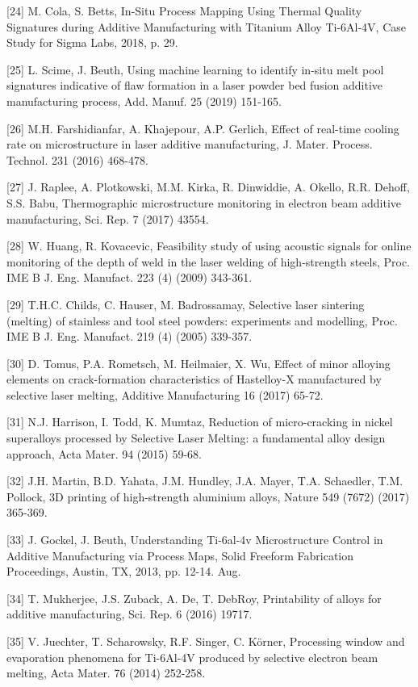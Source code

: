 \documentclass[10pt]{article}
\begin{document}
[24] M. Cola, S. Betts, In-Situ Process Mapping Using Thermal Quality Signatures during Additive Manufacturing with Titanium Alloy Ti-6Al-4V, Case Study for Sigma Labs, 2018, p. 29.

[25] L. Scime, J. Beuth, Using machine learning to identify in-situ melt pool signatures indicative of flaw formation in a laser powder bed fusion additive manufacturing process, Add. Manuf. 25 (2019) 151-165.

[26] M.H. Farshidianfar, A. Khajepour, A.P. Gerlich, Effect of real-time cooling rate on microstructure in laser additive manufacturing, J. Mater. Process. Technol. 231 (2016) 468-478.

[27] J. Raplee, A. Plotkowski, M.M. Kirka, R. Dinwiddie, A. Okello, R.R. Dehoff, S.S. Babu, Thermographic microstructure monitoring in electron beam additive manufacturing, Sci. Rep. 7 (2017) 43554.

[28] W. Huang, R. Kovacevic, Feasibility study of using acoustic signals for online monitoring of the depth of weld in the laser welding of high-strength steels, Proc. IME B J. Eng. Manufact. 223 (4) (2009) 343-361.

[29] T.H.C. Childs, C. Hauser, M. Badrossamay, Selective laser sintering (melting) of stainless and tool steel powders: experiments and modelling, Proc. IME B J. Eng. Manufact. 219 (4) (2005) 339-357.

[30] D. Tomus, P.A. Rometsch, M. Heilmaier, X. Wu, Effect of minor alloying elements on crack-formation characteristics of Hastelloy-X manufactured by selective laser melting, Additive Manufacturing 16 (2017) 65-72.

[31] N.J. Harrison, I. Todd, K. Mumtaz, Reduction of micro-cracking in nickel superalloys processed by Selective Laser Melting: a fundamental alloy design approach, Acta Mater. 94 (2015) 59-68.

[32] J.H. Martin, B.D. Yahata, J.M. Hundley, J.A. Mayer, T.A. Schaedler, T.M. Pollock, 3D printing of high-strength aluminium alloys, Nature 549 (7672) (2017) 365-369.

[33] J. Gockel, J. Beuth, Understanding Ti-6al-4v Microstructure Control in Additive Manufacturing via Process Maps, Solid Freeform Fabrication Proceedings, Austin, TX, 2013, pp. 12-14. Aug.

[34] T. Mukherjee, J.S. Zuback, A. De, T. DebRoy, Printability of alloys for additive manufacturing, Sci. Rep. 6 (2016) 19717.

[35] V. Juechter, T. Scharowsky, R.F. Singer, C. Körner, Processing window and evaporation phenomena for Ti-6Al-4V produced by selective electron beam melting, Acta Mater. 76 (2014) 252-258.
\end{document}
